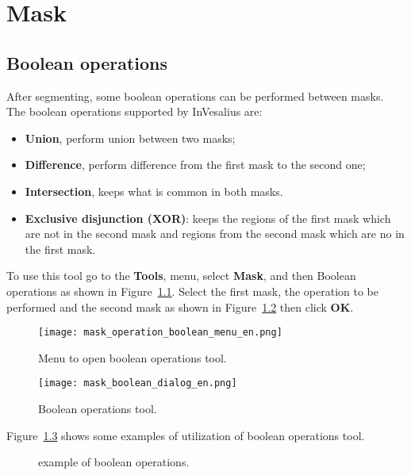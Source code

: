 \chapter{Mask}


\section{Boolean operations}

After segmenting, some boolean operations can be performed between masks. The boolean operations supported by InVesalius are:\\

\begin{itemize}
	\item \textbf{Union}, perform union between two masks;
	\item \textbf{Difference}, perform difference from the first mask to the second one;\\
	\item \textbf{Intersection}, keeps what is common in both masks.\\
	\item \textbf{Exclusive disjunction (XOR)}: keeps the regions of the first mask which are not in the second mask and regions from the second mask which are no in the first mask.
\end{itemize}

To use this tool go to the \textbf{Tools}, menu, select \textbf{Mask}, and then Boolean operations as shown in Figure~\ref{fig:booleano_menu}. Select the first mask, the operation to be performed and the second mask as shown in Figure~\ref{fig:booleano_janela} then click \textbf{OK}.


\begin{figure}[!htb]
\centering
\texttt{[image: mask\_operation\_boolean\_menu\_en.png]}
\caption{Menu to open boolean operations tool.}
\label{fig:booleano_menu}
\end{figure}


\begin{figure}[!htb]
\centering
\texttt{[image: mask\_boolean\_dialog\_en.png]}
\caption{Boolean operations tool.}
\label{fig:booleano_janela}
\end{figure}

Figure~\ref{fig:op_boolana} shows some examples of utilization of boolean operations tool.

\begin{figure}[!htb]
  \centering
  \hfill
  \hfill
  \hfill
  \hfill
  \hfill
  \caption{example of boolean operations.}
  \label{fig:op_boolana}
\end{figure}

